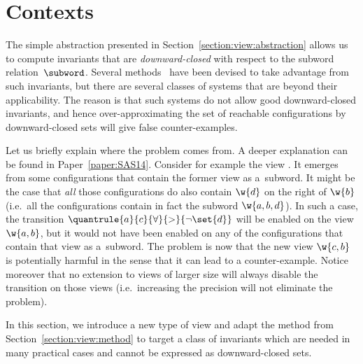 \section{Contexts}
\label{section:view:contexts}
%
%
The simple abstraction presented in
Section~\ref{section:view:abstraction} allows us to compute
invariants that are \emph{downward-closed} with
respect to the subword relation~$\subword$. Several methods~%
\cite{%
  CTV06,%
  PRZ-tacas01,%
  BHV04,%
  AJNO:simple,%
  APRXZ01,%
  Namjoshi:VMCAI07,%
  rmc:wo:transducers,%
  GerSis:many,%
  PXZ02}
have been devised to take advantage from such invariants, but there
are several classes of systems that are beyond their applicability.
%
The reason is that such systems do not allow good downward-closed
invariants, and hence over-approximating the set of reachable
configurations by downward-closed sets will give false
counter-examples.
%


Let us briefly explain where the problem comes from. A deeper
explanation can be found in Paper~\ref{paper:SAS14}.
%
Consider for example the view . It emerges from some
configurations that contain the former view as a~subword.
%
It might be the case %
that \emph{all} those configurations do also contain $\w{d}$ on the
right of $\w{b}$ (i.e.\ all the configurations contain in fact the
subword $\w{a,b,d}$).
%
In such a case, the transition
$\quantrule{a}{c}{\forall}{>}{\neg\set{d}}$ will be enabled on the
view $\w{a,b}$, but it would not have been enabled on any of the
configurations that contain that view as a~subword.
%
The problem is now that the new view $\w{c,b}$ is potentially harmful
in the sense that it can lead to a counter-example.
%
Notice moreover that no extension to views of larger size will always
disable the transition on those views (i.e.\ increasing the precision
will not eliminate the problem).

In this section, we introduce a new type of view and adapt the method
from Section~\ref{section:view:method} to target a class of invariants
which are needed in many practical cases and cannot be expressed as
downward-closed sets.

